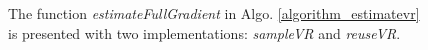 \documentclass[letterpaper]{article}
\begin{document}
\begin{figure}
\centering
{}
\caption{The function \emph{estimateFullGradient} in Algo. \ref{algorithm_estimatevr} is presented with two implementations: \emph{sampleVR} and \emph{reuseVR}.}
\label{figure_estimate_full_gradient}
\end{figure}
\end{document}
